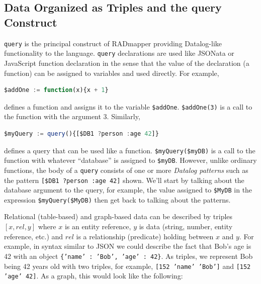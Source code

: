 \documentclass[10pt,letterpaper]{article} %
\newcommand{\stt}[1]{\texttt{#1}} %
\begin{document}
\subsection{Data Organized as Triples and the query Construct}

\stt{query} is the principal construct of RADmapper providing Datalog-like functionality to the language.
\stt{query} declarations are used like JSONata or JavaScript function declaration in the sense that the value of the declaration (a function) can be assigned to variables and used directly.
For example,
\begin{lstlisting}[language=JavaScript,numbers=none,basicstyle=\ttfamily\scriptsize]
$addOne := function(x){x + 1}
\end{lstlisting} \vspace{-2em}
defines a function and assigns it to the variable \stt{\$addOne}.
\stt{\$addOne(3)} is a call to the function with the argument 3.
Similarly,
\begin{lstlisting}[language=JavaScript,numbers=none,basicstyle=\ttfamily\scriptsize]
$myQuery := query(){[$DB1 ?person :age 42]}
\end{lstlisting} \vspace{-2em}
defines a query that can be used like a function.
\stt{\$myQuery(\$myDB)} is a call to the function with whatever ``database'' is assigned to \stt{\$myDB}.
However, unlike ordinary functions, the body of a \stt{query} consists of one or more \textit{Datalog patterns} such as the pattern \stt{[\$DB1 ?person :age 42]} shown.
We'll start by talking about the database argument to the query, for example, the value assigned to \stt{\$MyDB} in the expression \stt{\$myQuery(\$MyDB)} then get back to talking about the patterns.

Relational (table-based) and graph-based data can be described by triples $[x,rel,y]$ where $x$ is an entity reference, $y$ is data (string, number, entity reference, etc.) and $rel$ is a relationship (predicate) holding between $x$ and $y$.
For example, in syntax similar to JSON we could describe the fact that Bob's age is 42 with an object \stt{\{'name' : 'Bob', 'age' : 42\}}.
As triples, we represent Bob being 42 years old with two triples, for example, \stt{[152 'name' 'Bob']} and \stt{[152 'age' 42]}.
As a graph, this would look like the following:
\end{document}
